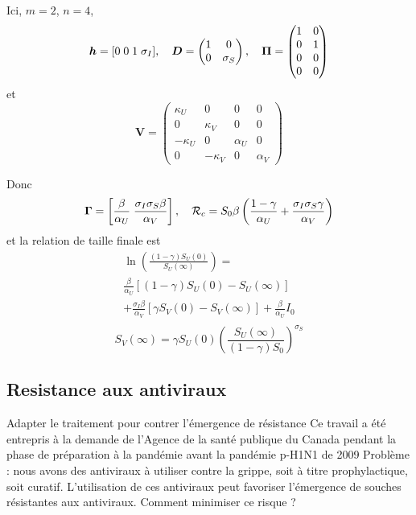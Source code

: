 \documentclass[aspectratio=169]{beamer}\usepackage[]{graphicx}\usepackage[]{xcolor}
\begin{document}
\begin{frame}
Ici, $m=2$, $n=4$,
\[
\bm{h} = [0\;0\;1\;\sigma_I],\quad
\bm{D}=\begin{pmatrix}
1 & 0 \\ 0 & \sigma_S
\end{pmatrix},\quad
\bm{\Pi}=
\begin{pmatrix}
1 & 0 \\ 0 & 1 \\ 0 & 0 \\ 0 & 0
\end{pmatrix}
\]
et
\[
\mathbf{V}=
\begin{pmatrix}
\kappa_U & 0 & 0 & 0 \\
0 & \kappa_V & 0 & 0 \\
-\kappa_U & 0 & \alpha_U & 0 \\
0 & -\kappa_V & 0 & \alpha_V
\end{pmatrix}
\]
\end{frame}

\begin{frame}
Donc
\[
\bm{\Gamma}=\left[
\frac{\beta}{\alpha_U}\; \frac{\sigma_I\sigma_S\beta}{\alpha_V}
\right],
\quad
\mathcal{R}_c = S_0\beta\left(
\frac{1-\gamma}{\alpha_U}+\frac{\sigma_I\sigma_S\gamma}{\alpha_V}
\right)
\]
et la relation de taille finale est
\begin{multline*}
\ln\left(
\frac{(1-\gamma)S_U(0)}{S_U(\infty)}
\right)
= \\ 
\frac{\beta}{\alpha_U}[(1-\gamma)S_U(0)-S_U(\infty)] \\
+\frac{\sigma_I\beta}{\alpha_V}[\gamma S_V(0)-S_V(\infty)]+\frac{\beta}{\alpha_U}I_0 \\
\end{multline*}
\[
S_V(\infty) = \gamma S_U(0)\left(
\frac{S_U(\infty)}{(1-\gamma)S_0}
\right)^{\sigma_S}
\]
\end{frame}

\subsection{Resistance aux antiviraux}

\nocite{ArinoBowmanMoghadas2009}

\begin{frame}{Adapter le traitement pour contrer l'émergence de résistance}
Ce travail a été entrepris à la demande de l'Agence de la santé publique du Canada pendant la phase de préparation à la pandémie avant la pandémie p-H1N1 de 2009
\vfill
Problème : nous avons des antiviraux à utiliser contre la grippe, soit à titre prophylactique, soit curatif. L'utilisation de ces antiviraux peut favoriser l'émergence de souches résistantes aux antiviraux. Comment minimiser ce risque ?
\end{frame}
\end{document}
